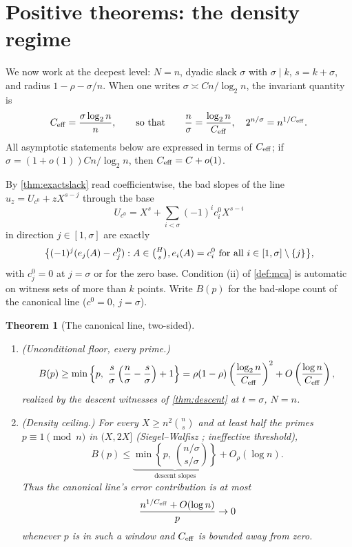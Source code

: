 \documentclass[11pt]{article}
\newtheorem{theorem}{Theorem}[section]
\theoremstyle{definition}
\newcommand{\ceff}{C_{\rm eff}}
\begin{document}
\section{Positive theorems: the density regime}\label{sec:positive}

We now work at the deepest level: $N=n$, dyadic slack $\sigma$ with $\sigma\mid k$, $s=k+\sigma$, and radius $1-\rho-\sigma/n$.  When one writes $\sigma\asymp Cn/\log_2 n$, the invariant quantity is
\[
        \ceff=\frac{\sigma\log_2 n}{n},
        \qquad\text{so that}\qquad
        \frac n\sigma=\frac{\log_2n}{\ceff},
        \quad 2^{n/\sigma}=n^{1/\ceff}.
\]
All asymptotic statements below are expressed in terms of $\ceff$; if $\sigma=(1+o(1))Cn/\log_2n$, then $\ceff=C+o(1)$.

By \cref{thm:exactslack} read coefficientwise, the bad slopes of the line $u_z=U_{c^0}+zX^{s-j}$ through the base
\[
        U_{c^0}=X^s+\sum_{i<\sigma}(-1)^ic^0_iX^{s-i}
\]
in direction $j\in[1,\sigma]$ are exactly
\[
        \big\{(-1)^j(e_j(A)-c^0_j):
        A\in\tbinom Hs,
        e_i(A)=c^0_i\ \text{for all }i\in[1,\sigma]\setminus\{j\}\big\},
\]
with $c^0_j=0$ at $j=\sigma$ or for the zero base.  Condition (ii) of \cref{def:mca} is automatic on witness sets of more than $k$ points.  Write $B(p)$ for the bad-slope count of the canonical line ($c^0=0$, $j=\sigma$).

\begin{theorem}[The canonical line, two-sided]\label{thm:diag}
\begin{enumerate}[label=(\roman*),leftmargin=2.2em]
\item\emph{(Unconditional floor, every prime.)}
\[
        B(p)\ge \min\left\{p,\ \frac s\sigma\left(\frac n\sigma-\frac s\sigma\right)+1\right\}
        =\rho(1-\rho)\left(\frac{\log_2n}{\ceff}\right)^2+O\left(\frac{\log n}{\ceff}\right),
\]
realized by the descent witnesses of \cref{thm:descent} at $t=\sigma$, $N=n$.
\item\emph{(Density ceiling.)}  For every $X\ge n^2\binom ns$ and at least half the primes $p\equiv1\pmod n$ in $(X,2X]$ (Siegel--Walfisz \cite{Dav00}; ineffective threshold),
\[
        B(p)\le
        \underbrace{\min\left\{p,\ \binom{n/\sigma}{s/\sigma}\right\}}_{\text{descent slopes}}
        +O_\rho(\log n).
\]
Thus the canonical line's error contribution is at most
\[
        \frac{n^{1/\ceff}+O(\log n)}{p}\to0
\]
whenever $p$ is in such a window and $\ceff$ is bounded away from zero.
\end{enumerate}
\end{theorem}
\end{document}
